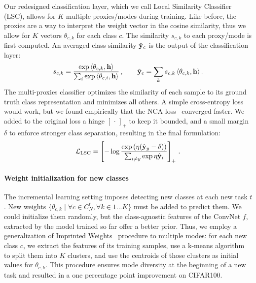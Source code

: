 Our redesigned classification layer, which we call Local Similarity Classifier (LSC), allows for $K$
multiple proxies/modes during training. Like before, the proxies are a way to interpret the weight
vector in the cosine similarity, thus we allow for $K$ vectors $\theta_{c,k}$ for each class $c$.
The similarity $s_{c,k}$ to each proxy/mode is first computed. An averaged class similarity $\hat{\mathbf{y}}_c$
is the output of the classification layer:
%
\begin{equation}
    s_{c,k} =\frac{\exp\,\langle\theta_{c,k},\mathbf{h}\rangle}{\sum_{i} \exp\,\langle\theta_{c,i},\mathbf{h}\rangle}\,, \qquad
    \hat{\mathbf{y}}_c = \sum_{k}s_{c,k}\,\langle\theta_{c,k},\mathbf{h}\rangle\,.
\end{equation}
%
The multi-proxies classifier optimizes the similarity of each sample to its ground truth class
representation and minimizes all others. A simple cross-entropy loss would work, but we found
empirically that the NCA loss~\citep{goldberger2005nca_loss,attias2017proxynca} converged faster. We
added to the original loss a hinge $[\,\cdot\,]_+$ to keep it bounded, and a small margin $\delta$
to enforce stronger class separation, resulting in the final formulation:
%
\begin{equation}
    \mathcal{L}_\text{LSC} = \left[- \log\frac{\exp\left(\eta (\hat{\mathbf{y}}_y - \delta)\right)}{\sum_{i \neq y} \exp \eta \hat{\mathbf{y}}_{i}} \right]_+ \,.
\end{equation}

\paragraph{Weight initialization for new classes} The incremental learning setting imposes detecting
new classes at each new task $t$. New weights $\{\theta_{c,k} \mid \forall c \in C^t_N, \forall k
    \in {1...K}\}$ must be added to predict them. We could initialize them randomly, but the
class-agnostic features of the \ac{ConvNet} $f$, extracted by the model trained so far offer a better
prior. Thus, we employ a generalization of Imprinted Weights~\citep{qi2018imprintedweights}
procedure to multiple modes: for each new class $c$, we extract the features of its training
samples, use a k-means algorithm to split them into $K$ clusters, and use the centroids of those
clusters as initial values for $\theta_{c,k}$. This procedure ensures mode diversity at the
beginning of a new task and resulted in a one percentage point improvement on CIFAR100.


